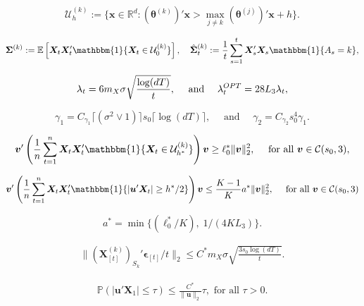 \documentclass[10pt,a4paper]{amsart}
\newcommand{\Exp}{\mathbb{E}}
\newcommand{\Pro}{\mathbb{P}}
\newcommand{\bSigma}{\boldsymbol{\Sigma}}
\newcommand{\bX}{\boldsymbol{X}}
\newcommand{\bd}[1]{\boldsymbol{#1}}
\newcommand{\bepsilon}{\bd{\epsilon}}
\newcommand{\btheta}{\boldsymbol{\theta}}
\newcommand{\bu}{\boldsymbol{u}}
\newcommand{\bv}{\boldsymbol{v}}
\newcommand{\hbSigma}{\hat{\boldsymbol{\Sigma}}}
\newcommand{\hdlambda}{\lambda^{\textup{OPT}}}
\newcommand{\idf}{\mathbbm{1}}
\newcommand{\mR}{\mathbb{R}}
\begin{document}
\begin{equation}\label{eq: U_h_k}
    \mathcal{U}_h^{(k)} := \{\bd{x}\in \mR^d: (\btheta^{(k)})'\bd{x}> \max_{j\ne k}(\btheta^{(j)})'\bd{x}+h\}.
\end{equation}

\begin{equation}\label{eq: hbSigma}
\begin{split}
\bSigma^{(k)} := \Exp\left[\bX_t\bX_t'\idf\{\bX_{t} \in \mathcal{U}_{0}^{(k)}\}\right], \quad 
    \hbSigma_t^{(k)}:=\frac{1}{t}\sum_{s=1}^{t}\bX_s'\bX_s\idf\{A_s=k\},
\end{split}
\end{equation}

\begin{equation} \label{app_eq: bandit_paras_est}
\lambda_t = 6m_X\sigma\sqrt{\frac{\log (dT)}{t}},\quad \text{ and } \quad \hdlambda_t = 28L_3\lambda_t,
\end{equation}

\begin{equation} \label{app_eq: end_times}
    \gamma_1 = C_{\gamma_1} \lceil(\sigma^2\vee 1)\rceil s_0 \lceil \log (dT) \rceil, \quad \text{ and } \quad \gamma_2 = C_{\gamma_2} s_0^4 \gamma_1.
\end{equation} 

    \begin{equation}\label{stage 2:aux_eq2}
\bv'\left(\frac{1}{n}\sum_{t=1}^{n} \bX_t\bX_t'\idf\{\bX_t\in \mathcal{U}_{h^*}^{(k)}\} \right) \bv \ge \ell_0^*\|\bv\|_2^2,\quad \text{ for all } 
\bv\in \mathcal{C}(s_0,3),    
\end{equation}

        \begin{equation}\label{stage 2:aux_eq3}
\bv'\left(\frac{1}{n}\sum_{t=1}^{n} \bX_t\bX_t'\idf\{|\bu'\bX_t|\ge h^*/2\} \right) \bv \le \frac{K-1}{K} a^* \|\bv\|_2^2,\quad \text{ for all } 
\bv\in \mathcal{C}(s_0,3)   
\end{equation}

\begin{equation}\label{eq: a}
    a^*= \min\{(\ell_0^*/K),\; 1/(4K L_3)\}.  %
\end{equation} 

\begin{align}\label{eq: x_bepsilon_S_k}
 \|(\bX_{[t]}^{(k)})_{S_k}'\bepsilon_{[t]}/t\|_2 \le C^*  m_X\sigma\sqrt{\frac{3s_0\log (dT)}{t}}.
\end{align}

\begin{align}
    \label{eq: margin}
    \Pro(|\bu'\bX_1|\le \tau)\le 
    \frac{C^*}{\|\bu\|_2 } \tau, \text{ for all } \tau>0.
\end{align}
\end{document}
